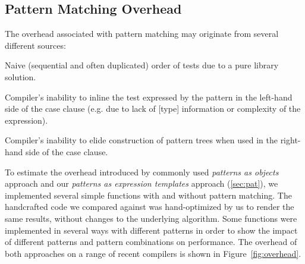 \subsection{Pattern Matching Overhead}
\label{sec:patcmp}

The overhead associated with pattern matching may originate from several 
different sources:

\begin{compactitem}
\setlength{\itemsep}{0pt}
\setlength{\parskip}{0pt}
\item Naive (sequential and often duplicated) order of tests due to a pure 
      library solution. 
\item Compiler's inability to inline the test expressed by the pattern in the 
      left-hand side of the case clause (e.g. due to lack of [type] information 
      or complexity of the expression). 
\item Compiler's inability to elide construction of pattern trees when used in 
      the right-hand side of the case clause.
\end{compactitem}

\noindent
To estimate the overhead introduced by commonly used \emph{patterns as objects} 
approach and our \emph{patterns as expression 
templates} approach (\textsection\ref{sec:pat}), we implemented several simple
functions with and without pattern matching. The handcrafted code we compared 
against was hand-optimized by us to render the same results, without changes to 
the underlying algorithm. Some functions were implemented in several ways with 
different patterns in order to show the impact of different patterns and pattern 
combinations on performance. The overhead of both approaches on a range of 
recent \Cpp{} compilers is shown in Figure~\ref{fig:overhead}.

